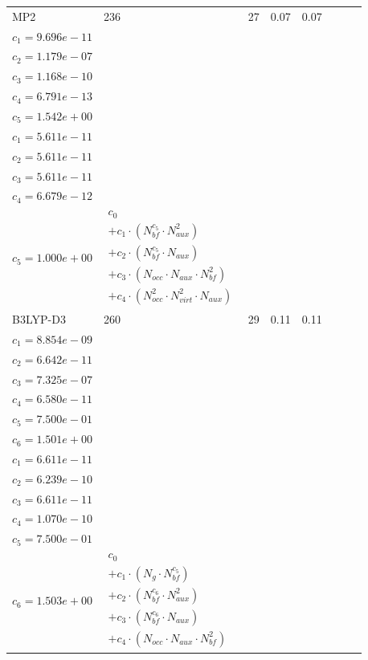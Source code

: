 \begin{longtable}{|p{1.7cm}|p{1.2cm}|p{1.1cm}|p{1.4cm}|p{1.3cm}|p{3.0cm}|p{3.0cm}|p{4.8cm}|}
MP2 & 236 & 27 & 0.07 & 0.07 & \begin{tabular}{l}\(c_{0}=4.381e+00\) \\ \(c_{1}=9.696e-11\) \\ \(c_{2}=1.179e-07\) \\ \(c_{3}=1.168e-10\) \\ \(c_{4}=6.791e-13\) \\ \(c_{5}=1.542e+00\)\end{tabular} & \begin{tabular}{l}\(c_{0}=0.000e+00\) \\ \(c_{1}=5.611e-11\) \\ \(c_{2}=5.611e-11\) \\ \(c_{3}=5.611e-11\) \\ \(c_{4}=6.679e-12\) \\ \(c_{5}=1.000e+00\)\end{tabular} & $\begin{array}{l}c_{0} \\ + c_{1}  \cdot  (N_{bf} ^{c_{5}}  \cdot  N_{aux} ^{2}) \\ + c_{2}  \cdot  (N_{bf} ^{c_{5}}  \cdot  N_{aux}) \\ + c_{3}  \cdot  (N_{occ}  \cdot  N_{aux}  \cdot  N_{bf} ^{2}) \\ + c_{4}  \cdot  (N_{occ} ^{2}  \cdot  N_{virt} ^{2}  \cdot  N_{aux})\end{array}$ \\ 
\hline
B3LYP-D3 & 260 & 29 & 0.11 & 0.11 & \begin{tabular}{l}\(c_{0}=4.360e+00\) \\ \(c_{1}=8.854e-09\) \\ \(c_{2}=6.642e-11\) \\ \(c_{3}=7.325e-07\) \\ \(c_{4}=6.580e-11\) \\ \(c_{5}=7.500e-01\) \\ \(c_{6}=1.501e+00\)\end{tabular} & \begin{tabular}{l}\(c_{0}=5.141e-11\) \\ \(c_{1}=6.611e-11\) \\ \(c_{2}=6.239e-10\) \\ \(c_{3}=6.611e-11\) \\ \(c_{4}=1.070e-10\) \\ \(c_{5}=7.500e-01\) \\ \(c_{6}=1.503e+00\)\end{tabular} & $\begin{array}{l}c_{0} \\ + c_{1}  \cdot  (N_{g}  \cdot  N_{bf} ^{c_{5}}) \\ + c_{2}  \cdot  (N_{bf} ^{c_{6}}  \cdot  N_{aux}^{2}) \\ + c_{3}  \cdot  (N_{bf} ^{c_{6}}  \cdot  N_{aux}) \\ + c_{4}  \cdot  (N_{occ}  \cdot  N_{aux}  \cdot  N_{bf} ^{2})\end{array}$ \\ 

\end{longtable}
